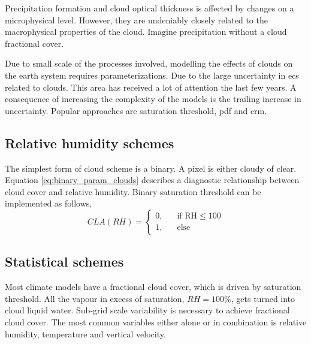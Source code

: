 Precipitation formation and cloud optical thickness is affected by changes on a microphysical level. However, they are undeniably closely related to the macrophysical properties of the cloud. Imagine precipitation without a cloud fractional cover. 

Due to small scale of the processes involved, modelling the effects of clouds on the earth system requires parameterizations. 
Due to the large uncertainty in \acrfull{ecs} related to clouds. This area has received a lot of attention the last few years. A consequence of increasing the complexity of the models is the trailing increase in uncertainty. Popular approaches are saturation threshold, \acrfull{pdf} and \acrfull{crm}. 


\subsection{Relative humidity schemes}
The simplest form of cloud scheme is a binary. A pixel is either cloudy of clear. Equation \eqref{eq:binary_param_clouds} describes a diagnostic relationship between cloud cover and relative humidity. Binary saturation threshold can be implemented as follows,
\begin{equation} \label{eq:binary_param_clouds}
    CLA\left(RH\right) = 
     \begin{cases}
       \text{0,} &\quad\text{if RH}\le100\\
       \text{1,} &\quad\text{else}
     \end{cases}
\end{equation}

\subsection{Statistical schemes}
Most climate models have a fractional cloud cover, which is driven by saturation threshold. All the vapour in excess of saturation, $RH=100\%$, gets turned into cloud liquid water. Sub-grid scale variability is necessary to achieve fractional cloud cover. The most common variables either alone or in combination is relative humidity, temperature and vertical velocity. 

